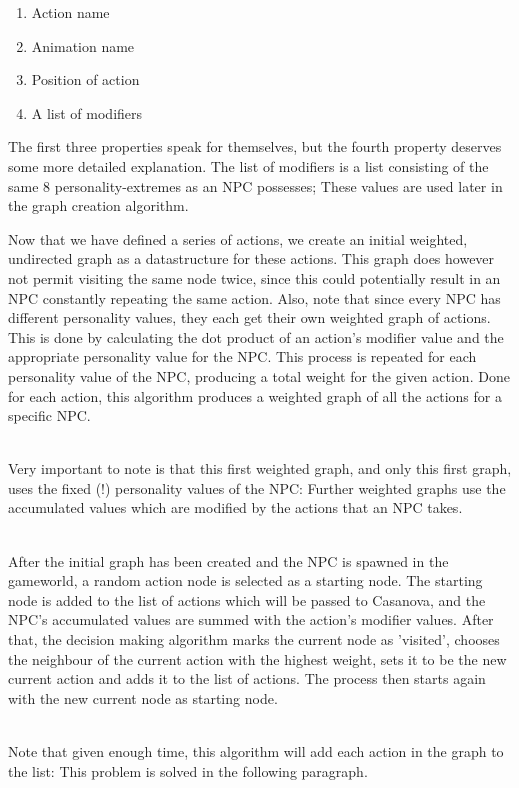 \documentclass[11pt]{article} %
\begin{document}
\begin{enumerate}
\item Action name
\item Animation name
\item Position of action
\item A list of modifiers
\end{enumerate}

The first three properties speak for themselves, but the fourth property deserves some more detailed explanation. The list of modifiers is a list consisting of the same 8 personality-extremes as an NPC possesses; These values are used later in the graph creation algorithm.

\newpage
Now that we have defined a series of actions, we create an initial weighted, undirected graph as a datastructure for these actions. This graph does however not permit visiting the same node twice, since this could potentially result in an NPC constantly repeating the same action. Also,  note that since every NPC has different personality values, they each get their own weighted graph of actions. This is done by calculating the dot product of an action's modifier value and the appropriate personality value for the NPC. This process is repeated for each personality value of the NPC, producing a total weight for the given action. Done for each action, this algorithm produces a weighted graph of all the actions for a specific NPC.

~\\
Very important to note is that this first weighted graph, and only this first graph, uses the fixed (!) personality values of the NPC: Further weighted graphs use the accumulated values which are modified by the actions that an NPC takes.

~\\
After the initial graph has been created and the NPC is spawned in the gameworld, a random action node is selected as a starting node. The starting node is added to the list of actions which will be passed to Casanova, and the NPC's accumulated values are summed with the action's modifier values. After that, the decision making algorithm marks the current node as 'visited', chooses the neighbour of the current action with the highest weight, sets it to be the new current action and adds it to the list of actions. The process then starts again with the new current node as starting node. 

~\\
Note that given enough time, this algorithm will add each action in the graph to the list: This problem is solved in the following paragraph.
\end{document}
